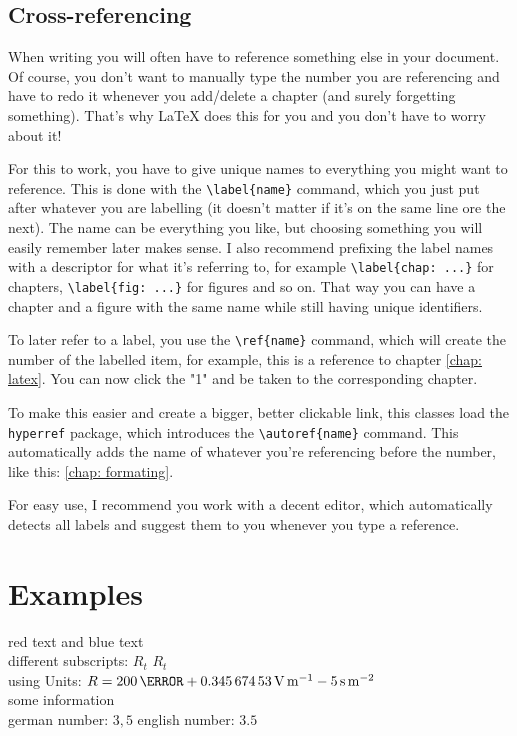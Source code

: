 \documentclass[	%
		fontsize=11pt,  %
		a4paper,	    %
		english,		%
		sans,			%
		f1,				%
	]{HsH-report}		%
\begin{document}
	\section{Cross-referencing} \label{sec: referencing}
		When writing you will often have to reference something else in your document. Of course, you don't want to manually type the number you are
		referencing and have to redo it whenever you add/delete a chapter (and surely forgetting something). That's why LaTeX does this for you and
		you don't have to worry about it!

		For this to work, you have to give unique names to everything you might want to reference. This is done with the \lstinline|\label{name}|
		command, which you just put after whatever you are labelling (it doesn't matter if it's on the same line ore the next). The name can be
		everything you like, but choosing something you will easily remember later makes sense. I also recommend prefixing the label names with a
		descriptor for what it's referring to, for example \lstinline|\label{chap: ...}| for chapters, \lstinline|\label{fig: ...}| for figures and so
		on. That way you can have a chapter and a figure with the same name while still having unique identifiers.

		\medskip
		To later refer to a label, you use the \lstinline|\ref{name}| command, which will create the number of the labelled item, for example, this is
		a reference to chapter \ref{chap: latex}. You can now click the "1" and be taken to the corresponding chapter.

		To make this easier and create a bigger, better clickable link, this classes load the \lstinline{hyperref} package, which introduces the
		\lstinline|\autoref{name}| command. This automatically adds the name of whatever you're referencing before the number, like this:
		\autoref{chap: formating}.

		\medskip
		For easy use, I recommend you work with a decent editor, which automatically detects all labels and suggest them to you whenever you type a
		reference.


\chapter{Examples} \label{chap: one}
	{\color{red}red text} and {\color{blue}blue text} \\
	different subscripts: \normalsubscripts$R_t$ \upsubscripts$R_t$ \\
	using Units: $R=200\,\mohm + \SI{0.34567453}{\volt\per\metre} - 5\,\si{\second\per\metre\squared}$ \\
	some information\cite{laboranleitung:physik}\\
	german number: $3,5$ english number: $3.5$\\ %
\end{document}
